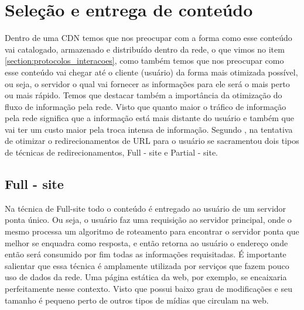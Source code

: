 \section{Sele\c{c}\~ao e entrega de conte\'udo}
\label{section:selecaoentrega}
Dentro de uma CDN temos que  nos preocupar com a forma como esse conte\'udo vai catalogado, armazenado e distribu\'ido dentro da rede, o que vimos no item \ref{section:protocolos_interacoes}, como tamb\'em temos que nos preocupar como esse conte\'udo vai chegar at\'e o cliente (usu\'ario) da forma mais otimizada poss\'ivel, ou seja, o servidor o qual vai fornecer as informa\c{c}\~oes para ele ser\'a o mais perto ou mais r\'apido. 
 Temos que destacar tamb\'em a import\^ancia da otimiza\c{c}\~ao do fluxo de informa\c{c}\~ao pela rede. Visto que quanto maior o tr\'afico de informa\c{c}\~ao pela rede significa que a informa\c{c}\~ao est\'a mais distante do usu\'ario e tamb\'em que vai ter um custo maior pela troca intensa de informa\c{c}\~ao. 
 Segundo \cite{krishnamurthy2001use}, na tentativa de otimizar o redirecionamentos de URL para o usu\'ario se sacramentou dois tipos de t\'ecnicas de redirecionamentos, Full - site e Partial - site.

\subsection{Full - site}
Na t\'ecnica de Full-site todo o conte\'udo \'e entregado ao usu\'ario de um servidor ponta \'unico. Ou seja, o usu\'ario faz uma requisi\c{c}\~ao ao servidor principal, onde o mesmo processa um algoritmo de roteamento para encontrar o servidor ponta que melhor se enquadra como resposta, e ent\~ao retorna ao usu\'ario o endere\c{c}o onde ent\~ao ser\'a consumido por fim todas as informa\c{c}\~oes requisitadas. 
 \'E importante salientar que essa t\'ecnica \'e amplamente utilizada por servi\c{c}os que fazem pouco uso de dados da rede. Uma p\'agina est\'atica da web, por exemplo, se encaixaria perfeitamente nesse contexto. Visto que possui baixo grau de modifica\c{c}\~oes e seu tamanho \'e pequeno perto de outros tipos de m\'idias que circulam na web.

